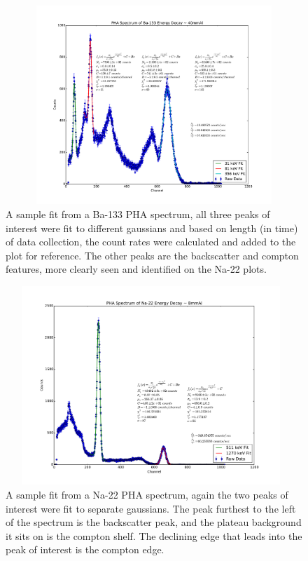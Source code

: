 \documentclass{article}
\newenvironment{tightcenter}{%
  \setlength\topsep{0pt}
  \setlength\parskip{0pt}
  \begin{center}
}{%
  \end{center}
}
\begin{document}
		\begin{tightcenter}
		\begin{figure}[!htb]
			\centering
			\includegraphics[width=13cm,height=7.5cm]{../plots/Ba40mmAl.pdf}
			\caption{A sample fit from a Ba-133 PHA spectrum, all three peaks of interest were fit to different gaussians and based on length (in time) of data collection, the count rates were calculated and added to the plot for reference.  The other peaks are the backscatter and compton features, more clearly seen and identified on the Na-22 plots.}
		\end{figure}

		\begin{figure}[!htb]
			\centering
			\includegraphics[width=11cm,height=7.5cm]{../plots/Na8mmAl.pdf}
			\caption{A sample fit from a Na-22 PHA spectrum, again the two peaks of interest were fit to separate gaussians.  The peak furthest to the left of the spectrum is the backscatter peak, and the plateau background it sits on is the compton shelf.  The declining edge that leads into the peak of interest is the compton edge.}
		\end{figure}
		\end{tightcenter}
\end{document}
